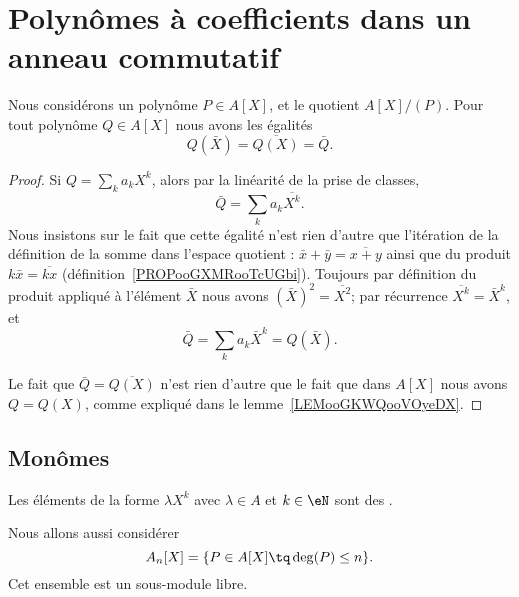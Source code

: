 \section{Polynômes à coefficients dans un anneau commutatif}
\label{SECooVMABooVdhbPo}

\begin{lemma}       \label{LEMooXFMAooMBgIrN}
	Nous considérons un polynôme \( P\in A[X]\), et le quotient \( A[X]/(P)\). Pour tout polynôme \( Q\in A[X]\) nous avons les égalités
	\begin{equation}
		Q(\bar X)=\overline{ Q(X) }=\bar Q.
	\end{equation}
\end{lemma}

\begin{proof}
	Si \( Q=\sum_ka_kX^k\), alors par la linéarité de la prise de classes,
	\begin{equation}        \label{EQooXQRMooIPGFVM}
		\bar Q=\sum_ka_k\overline{ X^k }.
	\end{equation}
	Nous insistons sur le fait que cette égalité n'est rien d'autre que l'itération de la définition de la somme dans l'espace quotient : \( \bar x+\bar y=\overline{ x+y }\) ainsi que du produit \( k\bar x=\overline{ kx }\) (définition~\ref{PROPooGXMRooTcUGbi}). Toujours par définition du produit appliqué à l'élément \( \bar X\) nous avons \( (\bar X)^2=\overline{ X^2 }\); par récurrence \( \overline{ X^k }=\bar X^k\), et
	\begin{equation}
		\bar Q=\sum_ka_k\bar X^k=Q(\bar X).
	\end{equation}

	Le fait que \( \bar Q=\overline{ Q(X) }\) n'est rien d'autre que le fait que dans \( A[X]\) nous avons \( Q=Q(X)\), comme expliqué dans le lemme~\ref{LEMooGKWQooVOyeDX}.
\end{proof}

\subsection{Monômes}

\begin{normaltext}
	Les éléments de la forme \( \lambda X^k\) avec \( \lambda\in A\) et \( k\in\eN\) sont des .

	Nous allons aussi considérer
	\begin{equation}
		A_n[X]=\{ P\in A[X]\tq \deg(P)\leq n \}.
	\end{equation}
	Cet ensemble est un sous-module libre.
\end{normaltext}

